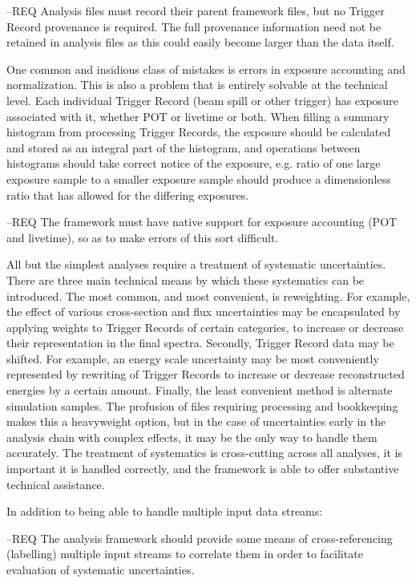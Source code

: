\documentclass[../main-v1.tex]{subfiles}
\begin{document}
--REQ Analysis files must record their parent framework files, but no Trigger Record provenance is required.  The full provenance information need not be retained in analysis files as this could easily become larger than the data itself.

One common and insidious class of mistakes is errors in exposure accounting and normalization. This is also a problem that is entirely solvable at the technical level.  Each individual Trigger Record (beam spill or other trigger) has exposure associated with it, whether POT or livetime or both. When filling a summary histogram from processing Trigger Records, the exposure should be calculated and stored as an integral part of the histogram, and operations between histograms should take correct notice of the exposure, e.g. ratio of one large exposure sample to a smaller exposure sample should produce a dimensionless ratio that has allowed for the differing exposures.

--REQ The framework must have native support for exposure accounting (POT and livetime), so as to make errors of this sort difficult.

All but the simplest analyses require a treatment of systematic uncertainties. There are three main technical means by which these systematics can be introduced. The most common, and most convenient, is reweighting. For example, the effect of various cross-section and flux uncertainties may be encapsulated by applying weights to Trigger Records of certain categories, to increase or decrease their representation in the final spectra. Secondly, Trigger Record data may be shifted. For example, an energy scale uncertainty may be most conveniently represented by rewriting of Trigger Records to increase or decrease reconstructed energies by a certain amount. Finally, the least convenient method is alternate simulation samples. The profusion of files requiring processing and bookkeeping makes this a heavyweight option, but in the case of uncertainties early in the analysis chain with complex effects, it may be the only way to handle them accurately. The treatment of systematics is cross-cutting across all analyses, it is important it is handled correctly, and the framework is able to offer substantive technical assistance.

In addition to being able to handle multiple input data streams:

--REQ The analysis framework should provide some means of cross-referencing (labelling) multiple input streams to correlate them in order to facilitate evaluation of systematic uncertainties.
\end{document}
